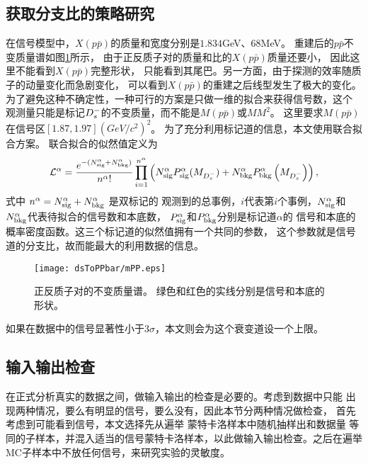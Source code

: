 \subsection{获取分支比的策略研究}
在信号模型中，$X(p\bar{p})$的质量和宽度分别是$1.834$GeV、$68$MeV。
重建后的$p\bar{p}$不变质量谱如图\ref{fig:mPP}所示，
由于正反质子对的质量和比的$X(p\bar{p})$质量还要小，
因此这里不能看到$X(p\bar{p})$完整形状，
只能看到其尾巴。另一方面，由于探测的效率随质子的动量变化而急剧变化，
可以看到$X(p\bar{p})$的重建之后线型发生了极大的变化。
为了避免这种不确定性，一种可行的方案是只做一维的拟合来获得信号数，这个
观测量只能是标记$D_{s}^{-}$的不变质量，而不能是$M(p\bar{p})$或$MM^{2}$。
这里要求$M(p\bar{p})$在信号区$[1.87,1.97] {(GeV/c^{2})}^{2}$。
为了充分利用标记道的信息，本文使用联合拟合方案。
联合拟合的似然值定义为
\begin{eqnarray}
    \mathcal{L}^{\alpha} = \frac{e^{- (N_{\rm sig}^{\alpha} + N_{\rm
    bkg}^{\alpha})}}{n^{\alpha}!}
     \prod_{i=1}^{n^{\alpha}}
    \left( N_{\rm sig}^{\alpha} P_{\rm sig}^{\alpha}(M_{D_{s}^{-}})
    + N_{\rm bkg}^{\alpha} P_{\rm bkg}^{\alpha}
    \left(M_{D_{s}^{-}}\right) \right),
\end{eqnarray}
式中 $n^{\alpha} = N_{\rm sig}^{\alpha} + N_{\rm bkg}^{\alpha}$ 是双标记的
观测到的总事例，$i$代表第$i$个事例，$N_{\rm sig}^{\alpha}$和$N_{\rm
bkg}^{\alpha}$代表待拟合的信号数和本底数，
$P_{\rm sig}^{\alpha}$和$P_{\rm bkg}^{\alpha}$分别是标记道$\alpha$的
信号和本底的概率密度函数。这三个标记道的似然值拥有一个共同的参数，
这个参数就是信号道的分支比，故而能最大的利用数据的信息。
\begin{figure}[htbp]
    \centering
    \texttt{[image: dsToPPbar/mPP.eps]}
    \caption{正反质子对的不变质量谱。
    绿色和红色的实线分别是信号和本底的形状。
    }\label{fig:mPP}
\end{figure}
如果在数据中的信号显著性小于3$\sigma$，本文则会为这个衰变道设一个上限。

\subsection{输入输出检查}
在正式分析真实的数据之间，做输入输出的检查是必要的。考虑到数据中只能
出现两种情况，要么有明显的信号，要么没有，因此本节分两种情况做检查，
首先考虑到可能看到信号，本文选择先从遍举 蒙特卡洛样本中随机抽样出和数据量
等同的子样本，并混入适当的信号蒙特卡洛样本，以此做输入输出检查。之后在遍举
MC子样本中不放任何信号，来研究实验的灵敏度。

